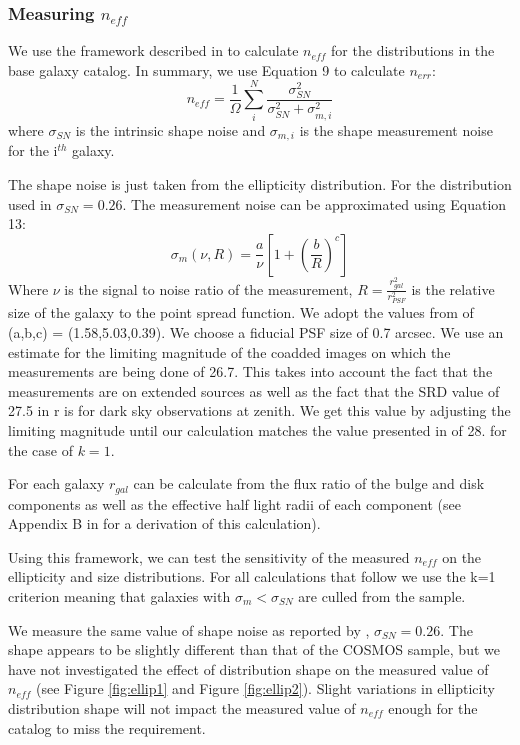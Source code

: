 \documentclass[]{article}
\begin{document}
\subsubsection{Measuring $n_{eff}$}
We use the framework described in \cite{chang} to calculate $n_{eff}$ for the distributions in the 
base galaxy catalog.  In summary, we use Equation 9 to calculate $n_{err}$:
\begin{equation}
n_{eff} = \frac{1}{\Omega}\sum^N_i\frac{\sigma^2_{SN}}{\sigma^2_{SN}+\sigma^2_{m,i}}
\end{equation}
where $\sigma_{SN}$ is the intrinsic shape noise and $\sigma_{m,i}$ is the shape measurement noise for the i$^{th}$ galaxy.

The shape noise is just taken from the ellipticity distribution.  For the distribution used in \cite{chang} $\sigma_{SN} = 0.26$.
The measurement noise can be approximated using Equation 13:
\begin{equation}
\sigma_m(\nu,R) = \frac{a}{\nu}\left[1+\left(\frac{b}{R}\right)^c\right]
\end{equation}
Where $\nu$ is the signal to noise ratio of the measurement, $R=\frac{r_{gal}^2}{r_{PSF}^2}$ is the relative size of the galaxy to
the point spread function.  We adopt the values from \cite{chang} of (a,b,c) = (1.58,5.03,0.39).  We choose a fiducial
PSF size of 0.7 arcsec. We use an estimate for the limiting magnitude of the coadded images on which the measurements are being
done of 26.7.  This takes into account the fact that the measurements are on extended sources as well as the fact that the SRD value 
of 27.5 in r is for dark sky observations at zenith.  We get this value by adjusting the limiting magnitude until our calculation
matches the value presented in \cite{chang} of 28. for the case of $k=1$.

For each galaxy $r_{gal}$ can be calculate from the flux ratio of the bulge and disk components as well as the effective half light 
radii of each component (see Appendix B in \cite{chang} for a derivation of this calculation).

Using this framework, we can test the sensitivity of the measured $n_{eff}$ on the ellipticity and size distributions.  For all calculations that follow we 
use the k=1 criterion meaning that galaxies with $\sigma_m < \sigma_{SN}$ are culled from the sample.

We measure the same value of shape noise as reported by \cite{chang}, $\sigma_{SN} = 0.26$.  The shape appears to be slightly different than
that of the COSMOS sample, but we have not investigated the effect of distribution shape on the measured value of $n_{eff}$ (see Figure \ref{fig:ellip1} 
and Figure \ref{fig:ellip2}).  
Slight variations in
ellipticity distribution shape will not impact the measured value of $n_{eff}$ enough for the catalog to miss the requirement.
\end{document}
